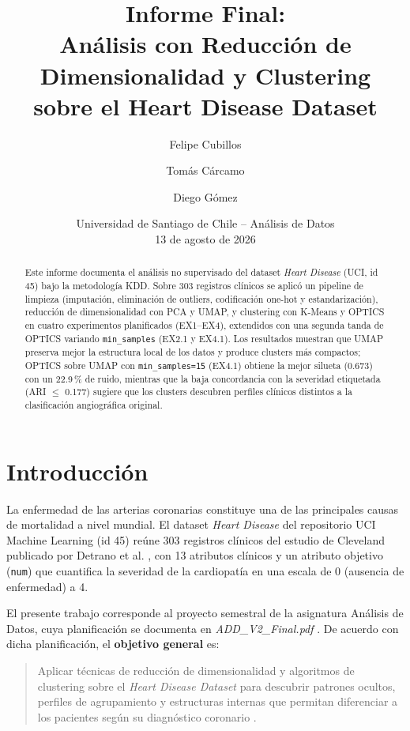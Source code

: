 \documentclass[11pt,a4paper]{article}
\title{Informe Final:\\ Análisis con Reducción de Dimensionalidad y Clustering\\ sobre el Heart Disease Dataset}
\author{Felipe Cubillos \and Tomás Cárcamo \and Diego Gómez}
\date{Universidad de Santiago de Chile -- Análisis de Datos\\ 13 de agosto de 2026}
\begin{document}
\maketitle

\begin{abstract}
Este informe documenta el análisis no supervisado del dataset \emph{Heart Disease} (UCI, id 45)
bajo la metodología KDD. Sobre 303 registros clínicos se aplicó un pipeline de limpieza
(imputación, eliminación de outliers, codificación one-hot y estandarización), reducción de
dimensionalidad con PCA y UMAP, y clustering con K-Means y OPTICS en cuatro experimentos
planificados (EX1--EX4), extendidos con una segunda tanda de OPTICS variando
\texttt{min\_samples} (EX2.1 y EX4.1). Los resultados muestran que UMAP preserva mejor la
estructura local de los datos y produce clusters más compactos; OPTICS sobre UMAP con
\texttt{min\_samples=15} (EX4.1) obtiene la mejor silueta (0.673) con un 22.9\,\% de ruido,
mientras que la baja concordancia con la severidad etiquetada (ARI $\leq$ 0.177) sugiere que
los clusters descubren perfiles clínicos distintos a la clasificación angiográfica original.
\end{abstract}

\tableofcontents
\clearpage

\section{Introducción}

La enfermedad de las arterias coronarias constituye una de las principales causas de
mortalidad a nivel mundial. El dataset \emph{Heart Disease} del repositorio UCI Machine
Learning (id 45) reúne 303 registros clínicos del estudio de Cleveland publicado por Detrano
et al. \cite{detrano1989}, con 13 atributos clínicos y un atributo objetivo (\texttt{num}) que
cuantifica la severidad de la cardiopatía en una escala de 0 (ausencia de enfermedad) a 4.

El presente trabajo corresponde al proyecto semestral de la asignatura Análisis de Datos, cuya
planificación se documenta en \emph{ADD\_V2\_Final.pdf} \cite{planificacion}. De acuerdo con
dicha planificación, el \textbf{objetivo general} es:

\begin{quote}
Aplicar técnicas de reducción de dimensionalidad y algoritmos de clustering sobre el
\emph{Heart Disease Dataset} para descubrir patrones ocultos, perfiles de agrupamiento y
estructuras internas que permitan diferenciar a los pacientes según su diagnóstico coronario
\cite{planificacion}.
\end{quote}
\end{document}
